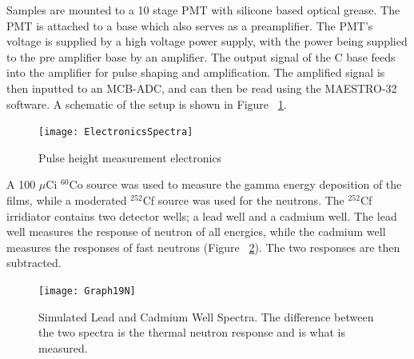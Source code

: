 \documentclass{anstrans}
\newcommand{\iso}[2]{${}^{#2}${#1}}
\begin{document}
Samples are mounted to a 10 stage PMT with silicone based optical grease.
The PMT is attached to a base which also serves as a preamplifier.   
The PMT's voltage is supplied by a high voltage power supply, with the power being supplied to the pre amplifier base by an amplifier.  
The output signal of the C base feeds into the amplifier for pulse shaping and amplification. 
The amplified signal is then inputted to an MCB-ADC, and can then be read using the MAESTRO-32 software. 
A schematic of the setup is shown in Figure ~\ref{fig:ElectronicsSpectra}.
\begin{figure}
	\centering
	\texttt{[image: ElectronicsSpectra]}
	\caption{Pulse height measurement electronics}
	\label{fig:ElectronicsSpectra}
\end{figure}
A 100 $\mu$Ci \iso{Co}{60} source was used to measure the gamma energy deposition of the films, while a moderated \iso{Cf}{252} source was used for the neutrons.
The \iso{Cf}{252} irridiator contains two detector wells; a lead well and a cadmium well.
The lead well measures the response of neutron of all energies, while the cadmium well measures the responses of fast neutrons (Figure ~\ref{fig:SimPbCdSpectra}).
The two responses are then subtracted.
\begin{figure}
	\centering
	\texttt{[image: Graph19N]}
	\caption{Simulated Lead and Cadmium Well Spectra. The difference between the two spectra is the thermal neutron response and is what is measured.}
	\label{fig:SimPbCdSpectra}
\end{figure}
\end{document}
